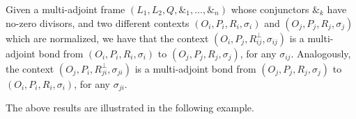 \documentclass[runningheads,a4paper]{llncs}
\newcommand{\adjoint}{\mathop{\&}\nolimits}
\newcommand{\cred}[1]{{\color{red} #1}}
\begin{document}





{\begin{corollary}\label{cor:extreme-multiadjoint-bonds-in-normalize-contexts}

Given a multi-adjoint frame $(L_1, L_2, Q, \adjoint_1, \dots, \adjoint_n)$ whose conjunctors $\adjoint_k$ have no-zero divisors, and two different contexts $(O_i, P_i, R_i, \sigma_i)$ and $(O_j, P_j, R_j, \sigma_j)$ which are normalized, we have that the context $(O_i, P_j, R_{ij}^\bot, \sigma_{ij})$ is a multi-adjoint bond from $(O_i, P_i, R_i, \sigma_i)$ to $(O_j, P_j, R_j, \sigma_j)$, for any $\sigma_{ij}$. Analogously, the context $(O_j, P_i, R_{ji}^\bot, \sigma_{ji})$ is a multi-adjoint bond from $(O_j, P_j, R_j, \sigma_j)$ to $(O_i, P_i, R_i, \sigma_i)$, for any $\sigma_{ji}$.

\end{corollary}}

The above results are illustrated in the following example.
\end{document}
